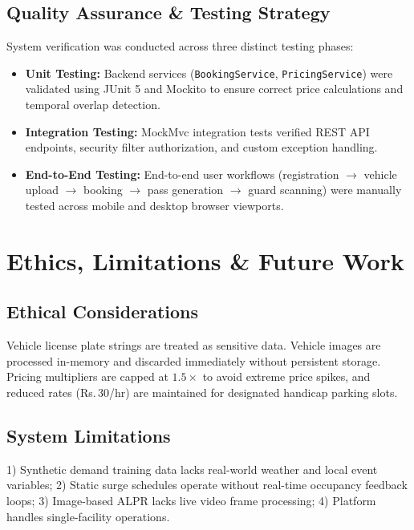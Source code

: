 \documentclass[conference,10pt]{IEEEtran}
\newcommand{\Rs}{\textrm{Rs.\,}}
\begin{document}
\subsection{Quality Assurance \& Testing Strategy}

System verification was conducted across three distinct testing phases:
\begin{itemize}[leftmargin=*]
    \item \textbf{Unit Testing:} Backend services (\texttt{BookingService}, \texttt{PricingService}) were validated using JUnit 5 and Mockito to ensure correct price calculations and temporal overlap detection.
    \item \textbf{Integration Testing:} MockMvc integration tests verified REST API endpoints, security filter authorization, and custom exception handling.
    \item \textbf{End-to-End Testing:} End-to-end user workflows (registration $\rightarrow$ vehicle upload $\rightarrow$ booking $\rightarrow$ pass generation $\rightarrow$ guard scanning) were manually tested across mobile and desktop browser viewports.
\end{itemize}

\section{Ethics, Limitations \& Future Work}

\subsection{Ethical Considerations}
Vehicle license plate strings are treated as sensitive data. Vehicle images are processed in-memory and discarded immediately without persistent storage. Pricing multipliers are capped at $1.5\times$ to avoid extreme price spikes, and reduced rates (\Rs30/hr) are maintained for designated handicap parking slots.

\subsection{System Limitations}
1) Synthetic demand training data lacks real-world weather and local event variables; 2) Static surge schedules operate without real-time occupancy feedback loops; 3) Image-based ALPR lacks live video frame processing; 4) Platform handles single-facility operations.
\end{document}
